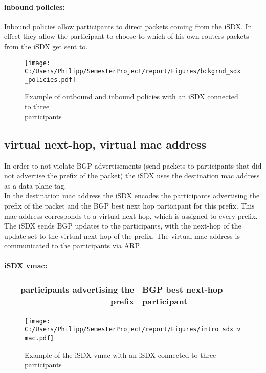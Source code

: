 \paragraph{\label{chapter2:iSDX:policies:inbound policies}inbound policies:}
Inbound policies allow participants to direct packets coming from the iSDX. In effect they allow the participant to choose to which of his own routers packets from the iSDX get sent to. 

\begin{figure}[h]
\texttt{[image: C:/Users/Philipp/SemesterProject/report/Figures/bckgrnd\_sdx\_policies.pdf]}
\caption{Example of outbound and inbound policies with an iSDX connected to three \\ participants}
\end{figure}


\subsection{\label{chapter2:iSDX:virtual next-hop, virtual mac address}virtual next-hop, virtual mac address}
In order to not violate BGP advertisements (send packets to participants that did not advertise the prefix of the packet) the iSDX uses the destination mac address as a data plane tag. \\ 
In the destination mac address the iSDX encodes the participants advertising the prefix of the packet and the BGP best next hop participant for this prefix. This mac address corresponds to a virtual next hop, which is assigned to every prefix. \\ The iSDX sends BGP updates to the participants, with the next-hop of the update set to the virtual next-hop of the prefix. The virtual mac address is communicated to the participants via ARP.
\paragraph{\label{chapter2:iSDX:virtual next-hop :inbound policies}iSDX vmac:}

\begin{tabular}{|r|l|}
  \hline 
  participants advertising the prefix & BGP best next-hop participant \\
  \hline
\end{tabular}

\begin{figure}[h]
\texttt{[image: C:/Users/Philipp/SemesterProject/report/Figures/intro\_sdx\_vmac.pdf]}
\caption{Example of the iSDX vmac with an iSDX connected to three participants}
\end{figure}

